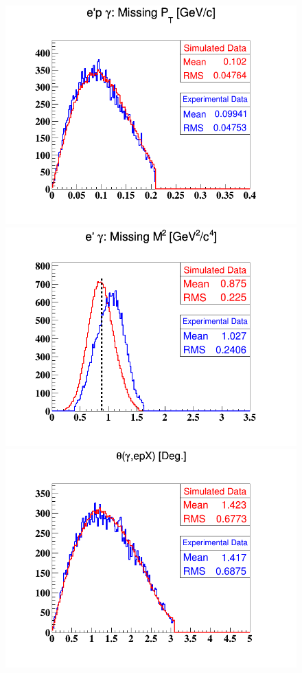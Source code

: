 \begin{figure}[h!]
\includegraphics[scale=0.35]{fig_dvcs/comp/InCoh_epgamma_PT_Mis.png}
\includegraphics[scale=0.35]{fig_dvcs/comp/InCoh_egamma_M2_Mis_InCoh.png}
\includegraphics[scale=0.35]{fig_dvcs/comp/InCoh_Theta_gammaX_InCoh.png}

\end{figure}

